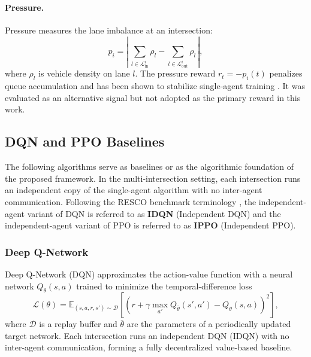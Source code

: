 \paragraph{Pressure.}
Pressure \citep{wei2019presslight} measures the lane imbalance at an intersection:
\begin{equation}
  p_i = \left|\,\sum_{l \in \mathcal{L}_{\mathrm{in}}^{i}} \rho_l
              - \sum_{l \in \mathcal{L}_{\mathrm{out}}^{i}} \rho_l\,\right|,
\end{equation}
where $\rho_l$ is vehicle density on lane $l$. The pressure reward $r_t = -p_i(t)$ penalizes queue accumulation and has been shown to stabilize single-agent training \citep{wei2019presslight}. It was evaluated as an alternative signal but not adopted as the primary reward in this work.

\subsection{DQN and PPO Baselines}
\label{sec:Methodology_ModelsAlgorithmsFrameworks}

The following algorithms serve as baselines or as the algorithmic foundation of the proposed framework. In the multi-intersection setting, each intersection runs an independent copy of the single-agent algorithm with no inter-agent communication. Following the RESCO benchmark terminology \citep{ault2021reinforcement}, the independent-agent variant of DQN is referred to as \textbf{IDQN} (Independent DQN) and the independent-agent variant of PPO is referred to as \textbf{IPPO} (Independent PPO).

\subsubsection{Deep Q-Network}
\label{sec:Methodology_DQN}

Deep Q-Network (DQN) \citep{mnih2015humanlevel} approximates the action-value function with a neural network $Q_\theta(s, a)$ trained to minimize the temporal-difference loss
\begin{equation}
  \mathcal{L}(\theta) =
    \mathbb{E}_{(s,a,r,s') \sim \mathcal{D}}
    \!\left[\left(r + \gamma \max_{a'} Q_{\bar\theta}(s', a') - Q_\theta(s, a)\right)^2\right],
\end{equation}
where $\mathcal{D}$ is a replay buffer and $\bar\theta$ are the parameters of a periodically updated target network. Each intersection runs an independent DQN (IDQN) with no inter-agent communication, forming a fully decentralized value-based baseline.

